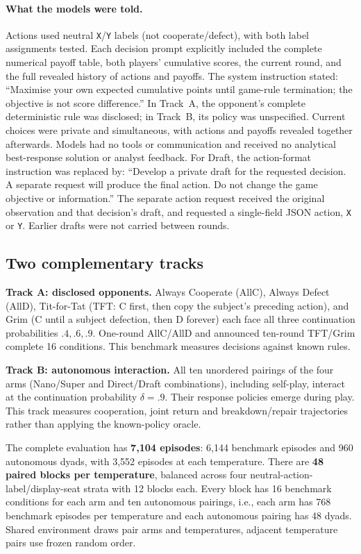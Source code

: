 \documentclass[11pt,a4paper]{article}
\begin{document}
\paragraph{What the models were told.}
Actions used neutral \texttt{X}/\texttt{Y} labels (not cooperate/defect), with both label assignments tested.
Each decision prompt explicitly included the complete numerical payoff table,
both players' cumulative scores, the current round, and the full revealed
history of actions and payoffs. The system instruction stated:
``Maximise your own expected cumulative points until game-rule termination;
the objective is not score difference.'' In Track~A, the opponent's complete deterministic rule was
disclosed; in Track~B, its policy was unspecified. Current choices were private
and simultaneous, with actions and payoffs revealed together afterwards.
Models had no tools or communication and received no analytical best-response
solution or analyst feedback.
For Draft, the action-format instruction was replaced by:
``Develop a private draft for the requested decision. A separate request will
produce the final action. Do not change the game objective or information.''
The separate action request received the original observation and that
decision's draft, and requested a single-field JSON action, \texttt{X} or
\texttt{Y}. Earlier drafts were not carried between rounds.
\subsection{Two complementary tracks}
\textbf{Track A: disclosed opponents.} Always Cooperate (AllC), Always Defect
(AllD), Tit-for-Tat (TFT: C first, then copy the subject's preceding action), and
Grim (C until a subject defection, then D forever) each face all three continuation
probabilities $.4,.6,.9$. One-round AllC/AllD and announced ten-round TFT/Grim
complete 16 conditions. This benchmark measures decisions against known rules.

\textbf{Track B: autonomous interaction.} All ten unordered pairings of the four
arms (Nano/Super and Direct/Draft combinations), including self-play, interact at the continuation probability $\delta=.9$.
Their response policies emerge during play. This track measures cooperation, joint return and breakdown/repair trajectories rather than applying the known-policy oracle.

The complete evaluation has \textbf{7,104 episodes}: 6,144 benchmark episodes
and 960 autonomous dyads, with 3,552 episodes at each temperature.
There are \textbf{48 paired blocks per temperature}, balanced across four
neutral-action-label/display-seat strata with 12 blocks each. Every block has
16 benchmark conditions for each arm and ten autonomous pairings, i.e.,
each arm has 768 benchmark episodes per temperature and each autonomous
pairing has 48 dyads. Shared environment draws pair arms and temperatures,
adjacent temperature pairs use frozen random order. 
\end{document}
